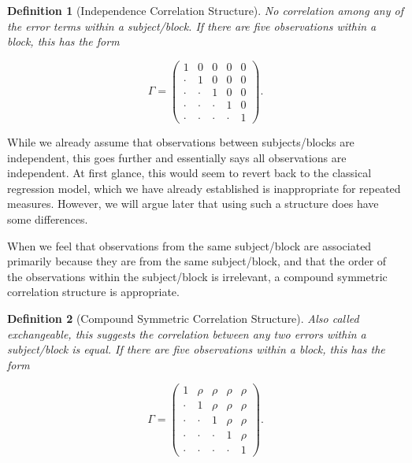 \documentclass[
]{book}
\theoremstyle{plain}
\theoremstyle{mydefn}
\newtheorem{definition}{Definition}[chapter]
\theoremstyle{myexmpl}
\theoremstyle{remark}
\begin{document}
\begin{definition}[Independence Correlation Structure]
\protect\hypertarget{def:defn-independence}{}{\label{def:defn-independence} {} }No correlation among any of the error terms within a subject/block. If there are five observations within a block, this has the form

\[\Gamma = \begin{pmatrix} 
1 & 0 & 0 & 0 & 0 \\
\cdot & 1 & 0 & 0 & 0 \\
\cdot & \cdot & 1 & 0 & 0 \\
\cdot & \cdot & \cdot & 1 & 0 \\
\cdot & \cdot & \cdot & \cdot & 1 \end{pmatrix}.\]
\end{definition}

While we already assume that observations between subjects/blocks are independent, this goes further and essentially says all observations are independent. At first glance, this would seem to revert back to the classical regression model, which we have already established is inappropriate for repeated measures. However, we will argue later that using such a structure does have some differences.

When we feel that observations from the same subject/block are associated primarily because they are from the same subject/block, and that the order of the observations within the subject/block is irrelevant, a compound symmetric correlation structure is appropriate.

\begin{definition}[Compound Symmetric Correlation Structure]
\protect\hypertarget{def:defn-compound-symmetric}{}{\label{def:defn-compound-symmetric} {} }Also called \emph{exchangeable}, this suggests the correlation between any two errors within a subject/block is equal. If there are five observations within a block, this has the form

\[\Gamma = \begin{pmatrix} 
1 & \rho & \rho & \rho & \rho \\
\cdot & 1 & \rho & \rho & \rho \\
\cdot & \cdot & 1 & \rho & \rho \\
\cdot & \cdot & \cdot & 1 & \rho \\
\cdot & \cdot & \cdot & \cdot & 1 \end{pmatrix}.\]
\end{definition}
\end{document}
